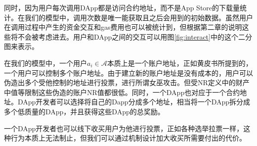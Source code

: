 同时，因为用户每次调用DApp都是访问合约地址，而不是App Store的下载量统计。在我们的模型中，调用次数是唯一能获取且之后会用到的初始数据。虽然用户在调用过程中产生的资金交互和gas费用也可以被统计到，但根据第二章的说明这些将不会被考虑进去。用户和DApp之间的交互可以用图\ref{fig:interact}中的这个二分图来表示。

在我们的模型中，一个用户$a_i \in \mathcal{A}$本质上是一个账户地址，正如黄皮书所提到的，一个用户可以控制多个账户地址。由于建立新的账户地址是没有成本的，用户可以伪造出多个受他控制的地址进行投票，进行所谓女巫攻击。但受NR定义中的财产中值等限制这些伪造的账户NR值都很低。同时，一个DApp也对应于一个合约地址。DApp开发者可以选择将自己的Dapp分成多个地址，相当将一个DApp拆分成多个低质量的DApp，并且获得这些DApp的总奖励。

一个DApp开发者也可以线下收买用户为他进行投票，正如各种选举拉票一样，这种行为本质上无法制止，但我们可以通过机制设计加大收买所需要付出的代价。
